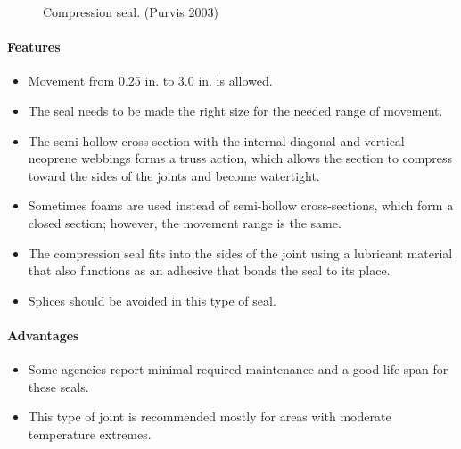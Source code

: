 \begin{figure}
  \begin{minipage}{0.48\linewidth}\centering
    \label{fig:compression-seal-plain}
  \end{minipage}
  \begin{minipage}{0.48\linewidth}\centering
    \label{fig:compression-seal-armored}
  \end{minipage}
  \caption{Compression seal. (Purvis 2003)}
  \label{fig:compression-seal}
\end{figure}

\paragraph{Features}
\begin{itemize}
  \item Movement from 0.25 in. to 3.0 in. is allowed.
  \item The seal needs to be made the right size for the needed range of movement.
  \item The semi-hollow cross-section with the internal diagonal and vertical neoprene webbings forms a truss
  action, which allows the section to compress toward the sides of the joints and become watertight.
  \item Sometimes foams are used instead of semi-hollow cross-sections, which form a closed section; however, the
  movement range is the same.
  \item The compression seal fits into the sides of the joint using a lubricant material that also functions as an
  adhesive that bonds the seal to its place.
  \item Splices should be avoided in this type of seal.
\end{itemize}
\paragraph{Advantages}
\begin{itemize}
  \item Some agencies report minimal required maintenance and a good life span for these seals.
  \item This type of joint is recommended mostly for areas with moderate temperature extremes.
\end{itemize}

